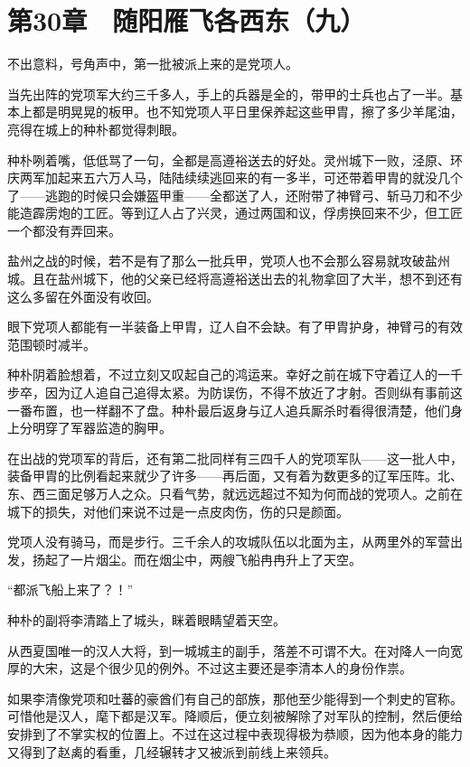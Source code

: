 \section{第30章　随阳雁飞各西东（九）}

不出意料，号角声中，第一批被派上来的是党项人。 

当先出阵的党项军大约三千多人，手上的兵器是全的，带甲的士兵也占了一半。基本上都是明晃晃的板甲。也不知党项人平日里保养起这些甲胄，擦了多少羊尾油，亮得在城上的种朴都觉得刺眼。 

种朴咧着嘴，低低骂了一句，全都是高遵裕送去的好处。灵州城下一败，泾原、环庆两军加起来五六万人马，陆陆续续逃回来的有一多半，可还带着甲胄的就没几个了——逃跑的时候只会嫌盔甲重——全都送了人，还附带了神臂弓、斩马刀和不少能造霹雳炮的工匠。等到辽人占了兴灵，通过两国和议，俘虏换回来不少，但工匠一个都没有弄回来。 

盐州之战的时候，若不是有了那么一批兵甲，党项人也不会那么容易就攻破盐州城。且在盐州城下，他的父亲已经将高遵裕送出去的礼物拿回了大半，想不到还有这么多留在外面没有收回。 

眼下党项人都能有一半装备上甲胄，辽人自不会缺。有了甲胄护身，神臂弓的有效范围顿时减半。 

种朴阴着脸想着，不过立刻又叹起自己的鸿运来。幸好之前在城下守着辽人的一千步卒，因为辽人追自己追得太紧。为防误伤，不得不放近了才射。否则纵有事前这一番布置，也一样翻不了盘。种朴最后返身与辽人追兵厮杀时看得很清楚，他们身上分明穿了军器监造的胸甲。 

在出战的党项军的背后，还有第二批同样有三四千人的党项军队——这一批人中，装备甲胄的比例看起来就少了许多——再后面，又有着为数更多的辽军压阵。北、东、西三面足够万人之众。只看气势，就远远超过不知为何而战的党项人。之前在城下的损失，对他们来说不过是一点皮肉伤，伤的只是颜面。 

党项人没有骑马，而是步行。三千余人的攻城队伍以北面为主，从两里外的军营出发，扬起了一片烟尘。而在烟尘中，两艘飞船冉冉升上了天空。 

“都派飞船上来了？！” 

种朴的副将李清踏上了城头，眯着眼睛望着天空。 

从西夏国唯一的汉人大将，到一城城主的副手，落差不可谓不大。在对降人一向宽厚的大宋，这是个很少见的例外。不过这主要还是李清本人的身份作祟。 

如果李清像党项和吐蕃的豪酋们有自己的部族，那他至少能得到一个刺史的官称。可惜他是汉人，麾下都是汉军。降顺后，便立刻被解除了对军队的控制，然后便给安排到了不掌实权的位置上。不过在这过程中表现得极为恭顺，因为他本身的能力又得到了赵禼的看重，几经辗转才又被派到前线上来领兵。 


